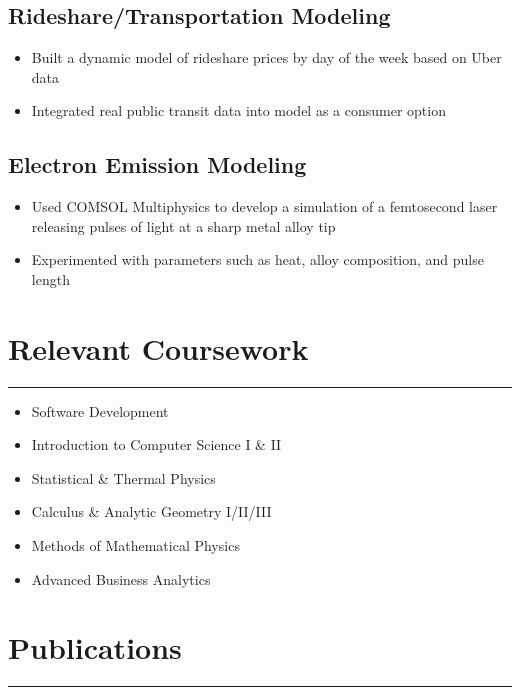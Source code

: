 \documentclass[11pt,a4paper]{article}
\newenvironment{myitemize}
{ \begin{itemize}[label={--}, leftmargin=*]
    \setlength{\itemsep}{0pt}
    \setlength{\parskip}{0pt}
    \setlength{\parsep}{0pt}     }
{ \end{itemize}                  }
\begin{document}
\subsection*{Rideshare/Transportation Modeling \hfill {} }

\begin{myitemize}
\item Built a dynamic model of rideshare prices by day of the week based on Uber data
\item Integrated real public transit data into model as a consumer option
\end{myitemize}

\subsection*{Electron Emission Modeling \hfill {} }

\begin{myitemize}
\item Used COMSOL Multiphysics to develop a simulation of a femtosecond laser releasing
pulses of light at a sharp metal alloy tip
\item Experimented with parameters such as heat, alloy composition, and pulse length
\end{myitemize}



\section*{Relevant Coursework}
\hrule

\begin{multicols}{2}
\begin{itemize}[noitemsep] %
    \item Software Development
    \item Introduction to Computer Science I \& II
    \item Statistical \& Thermal Physics
    \item Calculus \& Analytic Geometry I/II/III
    \item Methods of Mathematical Physics
    \item Advanced Business Analytics
\end{itemize}

\end{multicols}

\section*{Publications}
\hrule
\vspace{6mm} %


\end{document}
